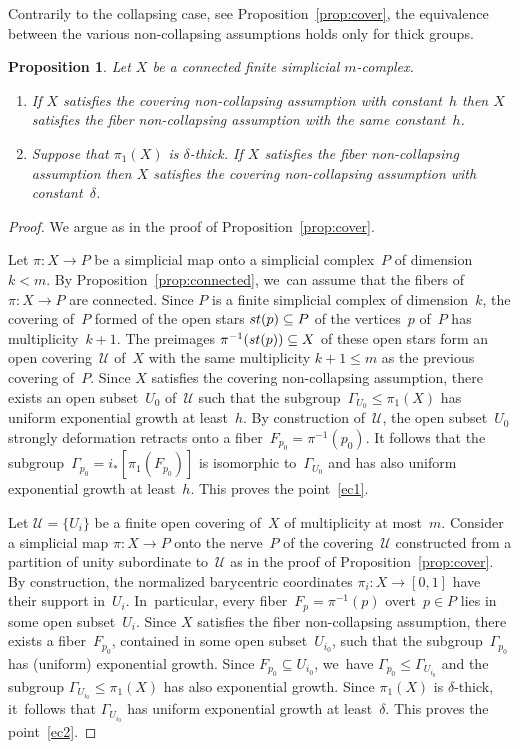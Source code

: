 \documentclass[11pt]{article}
\newtheorem{proposition}[theorem]{Proposition}
\theoremstyle{definition}
\numberwithin{equation}{section}
\begin{document}
Contrarily to the collapsing case, see Proposition~\ref{prop:cover}, the equivalence between the various non-collapsing assumptions holds only for thick groups.

\begin{proposition} \label{prop:exp.cover}
Let $X$ be a connected finite simplicial $m$\nobreakdash-complex.
\begin{enumerate}
\item If $X$ satisfies the covering non-collapsing assumption with constant~$h$ then $X$ satisfies the fiber non-collapsing assumption with the same constant~$h$. \label{ec1}
\item Suppose that $\pi_1(X)$ is $\delta$-thick.
If $X$ satisfies the fiber non-collapsing assumption then $X$ satisfies the covering non-collapsing assumption with constant~$\delta$. \label{ec2}
\end{enumerate}
\end{proposition}

\begin{proof}
We argue as in the proof of Proposition~\ref{prop:cover}.

Let $\pi:X \to P$ be a simplicial map onto a simplicial complex~$P$ of dimension~$k < m$.
By Proposition~\ref{prop:connected}, we~can assume that the fibers of~$\pi:X \to P$ are connected.
Since $P$ is a finite simplicial complex of dimension~$k$, the covering of~$P$ formed of the open stars ${\rm st}(p) \subseteq P$ of the vertices~$p$ of~$P$ has multiplicity~$k+1$.
The preimages $\pi^{-1}({\rm st}(p)) \subseteq X$ of these open stars form an open covering~$\mathcal{U}$ of~$X$ with the same multiplicity $k+1 \leq m$ as the previous covering of~$P$.
Since $X$ satisfies the covering non-collapsing assumption, there exists an open subset~$U_0$ of~$\mathcal{U}$ such that the subgroup~$\Gamma_{U_0} \leqslant \pi_1(X)$ has uniform exponential growth at least~$h$.
By construction of~$\mathcal{U}$, the open subset~$U_0$ strongly deformation retracts onto a fiber~$F_{p_0}=\pi^{-1}(p_0)$.
It follows that the subgroup~$\Gamma_{p_0} = i_*[\pi_1(F_{p_0})]$ is isomorphic to~$\Gamma_{U_0}$ and has also uniform exponential growth at least~$h$.
This proves the point~\eqref{ec1}.

Let $\mathcal{U}=\{U_i\}$ be a finite open covering of~$X$ of multiplicity at most~$m$.
Consider a simplicial map $\pi:X \to P$ onto the nerve~$P$ of the covering~$\mathcal{U}$ constructed from a partition of unity subordinate to~$\mathcal{U}$ as in the proof of Proposition~\ref{prop:cover}.
By construction, the normalized barycentric coordinates $\pi_i:X \to [0,1]$ have their support in~$U_i$. In~particular, every fiber~$F_p=\pi^{-1}(p)$ overt~$p \in P$ lies in some open subset~$U_i$.
Since $X$ satisfies the fiber non-collapsing assumption, there exists a fiber~$F_{p_0}$, contained in some open subset~$U_{i_0}$, such that the subgroup~$\Gamma_{p_0}$ has (uniform) exponential growth.
Since $F_{p_0} \subseteq U_{i_0}$, we~have $\Gamma_{p_0} \leqslant \Gamma_{U_{i_0}}$ and the subgroup $\Gamma_{U_{i_0}} \leqslant \pi_1(X)$ has also exponential growth.
Since $\pi_1(X)$ is $\delta$-thick, it~follows that $\Gamma_{U_{i_0}}$ has uniform exponential growth at least~$\delta$.
This proves the point~\eqref{ec2}.
\end{proof}
\end{document}

